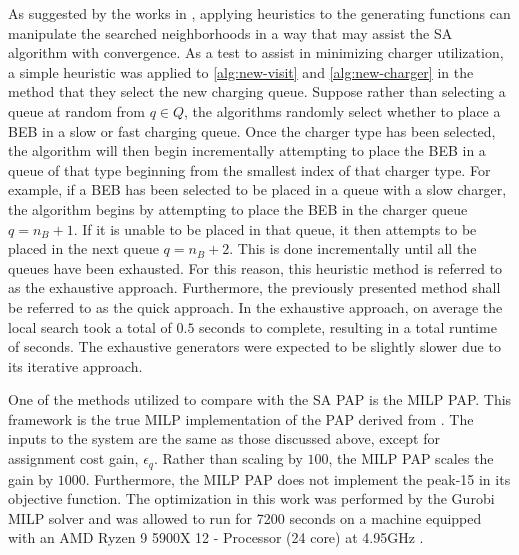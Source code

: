 \documentclass[11pt,a4paper,final]{article}
\newcommand{\tempcnt}{1517 }                                                    %
\newcommand{\exhaustivelocal}{0.5 }                                             %
\begin{document}
As suggested by the works in \cite{Zhang_2010,Xinchao_2011}, applying heuristics to the generating functions can
manipulate the searched neighborhoods in a way that may assist the SA algorithm with convergence. As a test to assist in
minimizing charger utilization, a simple heuristic was applied to \ref{alg:new-visit} and \ref{alg:new-charger} in the
method that they select the new charging queue. Suppose rather than selecting a queue at random from \(q \in Q\), the
algorithms randomly select whether to place a BEB in a slow or fast charging queue. Once the charger type has been
selected, the algorithm will then begin incrementally attempting to place the BEB in a queue of that type beginning from
the smallest index of that charger type. For example, if a BEB has been selected to be placed in a queue with a slow
charger, the algorithm begins by attempting to place the BEB in the charger queue \(q = n_B + 1\). If it is unable to be
placed in that queue, it then attempts to be placed in the next queue \(q = n_B + 2\). This is done incrementally until
all the queues have been exhausted. For this reason, this heuristic method is referred to as the exhaustive approach.
Furthermore, the previously presented method shall be referred to as the quick approach. In the exhaustive approach, on
average the local search took a total of \(\exhaustivelocal\) seconds to complete, resulting in a total runtime of
\fpeval{\exhaustivelocal * \tempcnt} seconds. The exhaustive generators were expected to be slightly slower
due to its iterative approach.

One of the methods utilized to compare with the SA PAP is the MILP PAP. This framework is the true MILP implementation
of the PAP derived from \cite{qarebagh-2019-optim-sched}. The inputs to the system are the same as those discussed
above, except for assignment cost gain, \(\epsilon_q\). Rather than scaling by \(100\), the MILP PAP scales the gain by \(1000\).
Furthermore, the MILP PAP does not implement the peak-15 in its objective function. The optimization in this work was
performed by the Gurobi MILP solver and was allowed to run for 7200 seconds on a machine equipped with an AMD Ryzen 9
5900X 12 - Processor (24 core) at 4.95GHz \cite{gurobi-2021-gurob-optim}.
\end{document}
